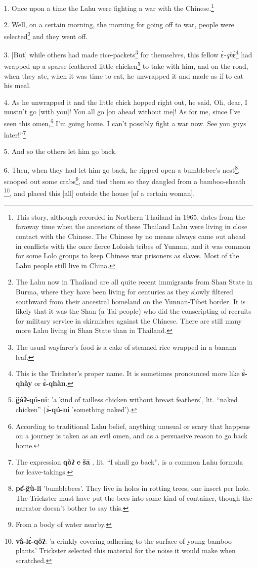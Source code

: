 \setcounter{footnote}{0}

1. Once upon a time the Lahu were fighting a war with the Chinese.\footnote{This story, although recorded in Northern Thailand in 1965, dates from the faraway time when the ancestors of these Thailand Lahu were living in close contact with the Chinese. The Chinese by no means always came out ahead in conflicts with the once fierce Loloish tribes of Yunnan, and it was common for some Lolo groups to keep Chinese war prisoners as slaves. Most of the Lahu people still live in China.}

2. Well, on a certain morning, the morning for going off to war, people were selected\footnote{The Lahu now in Thailand are all quite recent immigrants from Shan State in Burma, where they have been living for centuries as they slowly filtered southward from their ancestral homeland on the Yunnan-Tibet border. It is likely that it was the Shan (a Tai people) who did the conscripting of recruits for military service in skirmishes against the Chinese. There are still many more Lahu living in Shan State than in Thailand.}
and they went off.

3. [But] while others had made rice-packets\footnote{The usual wayfarer's food is a cake of steamed rice wrapped in a banana leaf.} for themselves, this fellow ɛ̀\textit{-qh}ɛ̀\footnote{This is the Trickster's proper name. It is sometimes pronounced more like \textbf{ɛ̀-qhày} or \textbf{ɛ̀-qhàn}.}
had wrapped up a sparse-feathered little chicken\footnote{\textbf{g̈âʔ-qú-ni}: 'a kind of tailless chicken without breast feathers', lit. ``naked chicken'' (\textbf{ɔ̀-qú-ni} 'something naked').} to take with him, and on the
road, when they ate, when it was time to eat, he unwrapped it and made as if to
eat his meal.

4. As he unwrapped it and the little chick hopped right out, he said, Oh, dear,
I mustn't go [with you]! You all go [on ahead without me]! As for me, since I've
seen this omen,\footnote{According to traditional Lahu belief, anything unusual or scary that happens on a journey is taken as an evil omen, and as a persuasive reason to go back home.} I'm going home. I can't possibly fight a war now. See you guys
later!''\footnote{The expression \textbf{qòʔ} \textbf{e} \textbf{šā} , lit. ``I shall go back'', is a common Lahu formula for leave-takings.}

5. And so the others let him go back.

6. Then, when they had let him go back, he ripped open a bumblebee's nest\footnote{\textbf{pɛ̂-g̈ù-li} 'bumblebees'. They live in holes in rotting trees, one insect per hole. The Trickster must have put the bees into some kind of container, though the narrator doesn't bother to say this.},
scooped out some crabs\footnote{From a body of water nearby.}, and tied them so they dangled from a bamboo-sheath
\footnote{\textbf{vâ-lɛ́-qôʔ}: 'a crinkly covering adhering to the surface of young bamboo plants.' Trickster selected this material for the noise it would make when scratched.}, and placed this [all] outside the house [of a certain woman].

